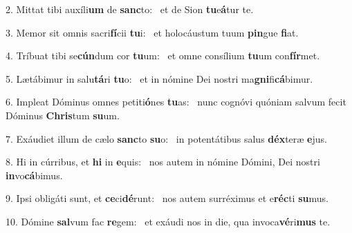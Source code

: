 2. Mittat tibi auxíli\textbf{um} de \textbf{sanc}to: \ast\  et de Sion \textbf{tu}e\textbf{á}tur te.\

3. Memor sit omnis sacri\textbf{fí}cii \textbf{tu}i: \ast\  et holocáustum tuum \textbf{pin}gue \textbf{fi}at.\

4. Tríbuat tibi se\textbf{cún}dum cor \textbf{tu}um: \ast\  et omne consílium \textbf{tu}um con\textbf{fír}met.\

5. Lætábimur in salu\textbf{tá}ri \textbf{tu}o: \ast\  et in nómine Dei nostri ma\textbf{gni}fi\textbf{cá}bimur.\

6. Impleat Dóminus omnes petiti\textbf{ó}nes \textbf{tu}as: \ast\  nunc cognóvi quóniam salvum fecit Dóminus \textbf{Chris}tum \textbf{su}um.\

7. Exáudiet illum de cælo \textbf{sanc}to \textbf{su}o: \ast\  in potentátibus salus \textbf{déx}teræ \textbf{e}jus.\

8. Hi in cúrribus, et \textbf{hi} in \textbf{e}quis: \ast\  nos autem in nómine Dómini, Dei nostri \textbf{in}vo\textbf{cá}bimus.\

9. Ipsi obligáti sunt, et \textbf{ce}ci\textbf{dé}runt: \ast\  nos autem surréximus et e\textbf{réc}ti \textbf{su}mus.\

10. Dómine \textbf{sal}vum fac \textbf{re}gem: \ast\  et exáudi nos in die, qua invoca\textbf{vé}ri\textbf{mus} te.\


